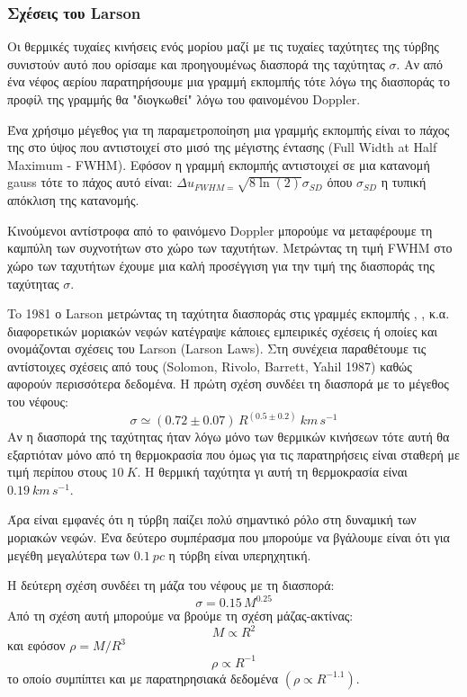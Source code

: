 \documentclass[a4paper,12pt]{memoir}
\begin{document}
\subsubsection{Σχέσεις του Larson}
\label{par:LarsonLaws}
Οι θερμικές τυχαίες κινήσεις ενός μορίου μαζί με τις τυχαίες ταχύτητες της τύρβης συνιστούν αυτό που ορίσαμε και προηγουμένως διασπορά της ταχύτητας $\sigma$. Αν από ένα νέφος αερίου παρατηρήσουμε μια γραμμή εκπομπής τότε λόγω της διασποράς το προφίλ της γραμμής θα "διογκωθεί" λόγω του φαινομένου Doppler. 

Ένα χρήσιμο μέγεθος για τη παραμετροποίηση μια γραμμής εκπομπής είναι το πάχος της στο ύψος που αντιστοιχεί στο μισό της μέγιστης έντασης (Full Width at Half Maximum - FWHM). Εφόσον η γραμμή εκπομπής αντιστοιχεί σε μια κατανομή gauss τότε το πάχος αυτό είναι: $\Delta u _{FWHM = }\sqrt{8 \ln(2)} \sigma _{SD}$ όπου $\sigma _{SD}$ η τυπική απόκλιση της κατανομής. 

Κινούμενοι αντίστροφα από το φαινόμενο Doppler μπορούμε να μεταφέρουμε τη καμπύλη των συχνοτήτων στο χώρο των ταχυτήτων. Μετρώντας τη τιμή FWHM στο χώρο των ταχυτήτων έχουμε μια καλή προσέγγιση για την τιμή της  διασποράς της ταχύτητας $\sigma$.

To 1981 ο Larson μετρώντας τη ταχύτητα διασποράς στις γραμμές εκπομπής , ,  κ.α. διαφορετικών μοριακών νεφών κατέγραψε κάποιες εμπειρικές σχέσεις ή οποίες και ονομάζονται σχέσεις του Larson (Larson Laws). Στη συνέχεια παραθέτουμε τις αντίστοιχες σχέσεις από τους (Solomon, Rivolo, Barrett, Yahil 1987) καθώς αφορούν περισσότερα δεδομένα.
Η πρώτη σχέση συνδέει τη διασπορά με το μέγεθος του νέφους:
\begin{equation}
\label{eq:LarsonR}
\sigma \simeq (0.72 \pm 0.07)\, R^{(0.5 \pm 0.2)} \ km\, s^{-1}
\end{equation} 
Αν η διασπορά της ταχύτητας ήταν λόγω μόνο των θερμικών κινήσεων τότε αυτή θα εξαρτιόταν μόνο από τη θερμοκρασία που όμως για τις παρατηρήσεις είναι σταθερή με τιμή περίπου στους $10 \ K$. Η θερμική ταχύτητα γι αυτή τη θερμοκρασία είναι $0.19\ km\, s^{-1}$.

Άρα είναι εμφανές ότι η τύρβη παίζει πολύ σημαντικό ρόλο στη δυναμική των μοριακών νεφών. Ένα δεύτερο συμπέρασμα που μπορούμε να βγάλουμε είναι ότι για μεγέθη μεγαλύτερα των $0.1 \ pc$ η τύρβη είναι υπερηχητική.

Η δεύτερη σχέση συνδέει τη μάζα του νέφους με τη διασπορά:
\begin{equation}
\label{eq:LarsonM}
\sigma = 0.15\, M^{0.25}
\end{equation}
Από τη σχέση αυτή μπορούμε να βρούμε τη σχέση μάζας-ακτίνας:
\begin{equation}
M\propto R^2
\end{equation}
και εφόσον $\rho = M/R^3$
\begin{equation}
\label{eq:Larsonrho}
\rho \propto R^{-1}
\end{equation}
το οποίο συμπίπτει και με παρατηρησιακά δεδομένα $(\rho \propto R^{-1.1})$.
\medskip
\end{document}
